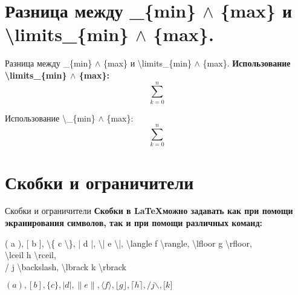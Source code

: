 \documentclass[aspectratio=169]{beamer}
\begin{document}
\section{Разница между \_\{min\} $\wedge$ \{max\} и \textbackslash limits\_\{min\} $\wedge$ \{max\}.}
\begin{frame}{Разница между \_\{min\} $\wedge$ \{max\} и \textbackslash limits\_\{min\} $\wedge$ \{max\}.}
    \bf
    \centering
    Использование \textbackslash limits\_\{min\} $\wedge$ \{max\}:
    \begin{equation*}
            \textstyle\sum\limits_{k=0}^{n}
    \end{equation*}

    Использование \textbackslash \_\{min\} $\wedge$ \{max\}:
    \begin{equation*}
            \textstyle\sum_{k=0}^{n}
    \end{equation*}    
\end{frame}

\section{Скобки и ограничители}
\begin{frame}{Скобки и ограничители}
    \textbf{Скобки в \LaTeX можно задавать как при помощи экранирования символов, так и при помощи различных команд:}

    \small
    ( a ), [ b ], \textbackslash\{ c \textbackslash\}, | d |, \textbackslash| e \textbackslash|,
    \textbackslash langle f \textbackslash rangle, \textbackslash lfloor g \textbackslash rfloor,\\
    \textbackslash lceil h \textbackslash rceil,\\
    / j \textbackslash backslash, \textbackslash lbrack k \textbackslash rbrack

    \centering
    $( a ), [ b ], \{ c \}, | d |, \| e \|,
    \langle f \rangle, \lfloor g \rfloor,
    \lceil h \rceil,
    / j \backslash, \lbrack k \rbrack
    $
\end{frame}
\end{document}
